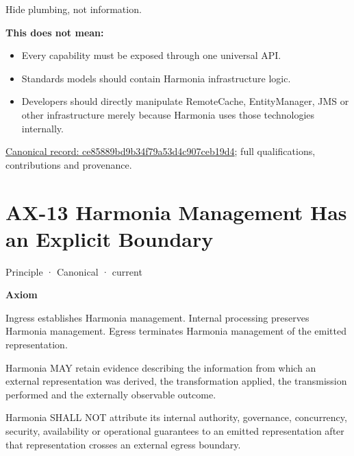 Hide plumbing, not information.



\textbf{This does not mean:}



\begin{itemize}


\item Every capability must be exposed through one universal API.

\item Standards models should contain Harmonia infrastructure logic.

\item Developers should directly manipulate RemoteCache, EntityManager, JMS or other infrastructure merely because Harmonia uses those technologies internally.

\end{itemize}

{\footnotesize \href{../../../../continuum/motivation/principle/ce85889bd9b34f79a53d4c907ceb19d4.md}{Canonical record: ce85889bd9b34f79a53d4c907ceb19d4}; full qualifications, contributions and provenance.}\par
\section{AX-13 Harmonia Management Has an Explicit Boundary}

\label{element:b6a55decfeec4f1bb3d7f18534a2ffea}
{\small Principle · Canonical · current}\par

\par\medskip\textbf{Axiom}\par


Ingress establishes Harmonia management. Internal processing preserves
Harmonia management. Egress terminates Harmonia management of the
emitted representation.



Harmonia MAY retain evidence describing the information from which an
external representation was derived, the transformation applied, the
transmission performed and the externally observable outcome.



Harmonia SHALL NOT attribute its internal authority, governance,
concurrency, security, availability or operational guarantees to an
emitted representation after that representation crosses an external
egress boundary.



